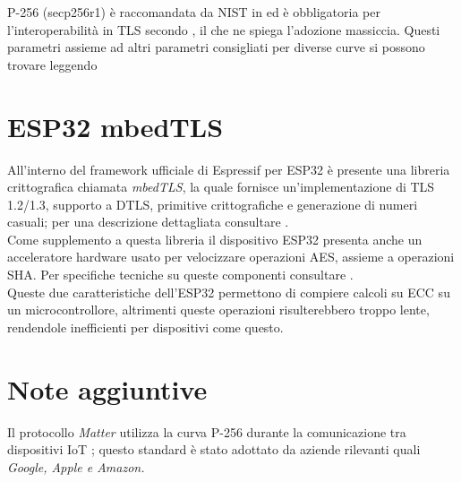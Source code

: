 \documentclass[12pt, a4paper]{report}
\begin{document}
P-256 (secp256r1) è raccomandata da NIST in \cite{fips186} ed è obbligatoria
per l'interoperabilità in TLS secondo \cite{rfc8422}, 
il che ne spiega l'adozione massiccia.
Questi parametri assieme ad altri parametri consigliati per diverse curve si
possono trovare leggendo \cite{sec2}

\section{ESP32 mbedTLS}
All'interno del framework ufficiale di Espressif per ESP32 è presente una libreria 
crittografica chiamata \textit{mbedTLS}, la quale fornisce un'implementazione di TLS 1.2/1.3,
supporto a DTLS, primitive crittografiche e generazione di numeri casuali;
per una descrizione dettagliata consultare \cite{espressif_mbedtls}.
\\Come supplemento a questa libreria il dispositivo ESP32 presenta anche un 
acceleratore hardware usato per velocizzare operazioni AES, assieme a operazioni SHA.
Per specifiche tecniche su queste componenti consultare \cite{esp32_trm}.
\\Queste due caratteristiche dell'ESP32 permettono di compiere calcoli su ECC su un microcontrollore, 
altrimenti queste operazioni risulterebbero troppo lente, rendendole inefficienti per dispositivi come questo.

\section{Note aggiuntive}
Il protocollo \textit{Matter} utilizza la curva P-256 durante la comunicazione 
tra dispositivi IoT \cite{matter}; questo standard è stato adottato da aziende rilevanti
quali \textit{Google, Apple e Amazon.}
\end{document}
